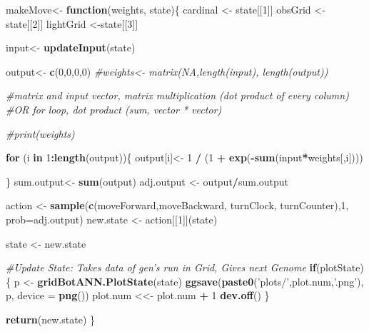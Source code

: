 \documentclass[]{article}
\newenvironment{Shaded}{\begin{snugshade}}{\end{snugshade}}
\newcommand{\CommentTok}[1]{\textcolor[rgb]{0.56,0.35,0.01}{\textit{#1}}}
\newcommand{\ControlFlowTok}[1]{\textcolor[rgb]{0.13,0.29,0.53}{\textbf{#1}}}
\newcommand{\DataTypeTok}[1]{\textcolor[rgb]{0.13,0.29,0.53}{#1}}
\newcommand{\DecValTok}[1]{\textcolor[rgb]{0.00,0.00,0.81}{#1}}
\newcommand{\KeywordTok}[1]{\textcolor[rgb]{0.13,0.29,0.53}{\textbf{#1}}}
\newcommand{\NormalTok}[1]{#1}
\newcommand{\OperatorTok}[1]{\textcolor[rgb]{0.81,0.36,0.00}{\textbf{#1}}}
\newcommand{\StringTok}[1]{\textcolor[rgb]{0.31,0.60,0.02}{#1}}
\begin{document}
\begin{Shaded}
\begin{Highlighting}[]
\NormalTok{makeMove<-}\StringTok{ }\ControlFlowTok{function}\NormalTok{(weights, state)\{}
\NormalTok{  cardinal <-}\StringTok{ }\NormalTok{state[[}\DecValTok{1}\NormalTok{]]}
\NormalTok{  obsGrid <-}\StringTok{ }\NormalTok{state[[}\DecValTok{2}\NormalTok{]]}
\NormalTok{  lightGrid <-state[[}\DecValTok{3}\NormalTok{]]}
  
\NormalTok{  input<-}\StringTok{ }\KeywordTok{updateInput}\NormalTok{(state)}
  
\NormalTok{  output<-}\StringTok{ }\KeywordTok{c}\NormalTok{(}\DecValTok{0}\NormalTok{,}\DecValTok{0}\NormalTok{,}\DecValTok{0}\NormalTok{,}\DecValTok{0}\NormalTok{)}
  \CommentTok{#weights<- matrix(NA,length(input), length(output))}
  
  \CommentTok{#matrix and input vector, matrix multiplication (dot product of every column)}
  \CommentTok{#OR for loop, dot product (sum, vector * vector)}
  
  \CommentTok{#print(weights)}
  
  \ControlFlowTok{for}\NormalTok{ (i }\ControlFlowTok{in} \DecValTok{1}\OperatorTok{:}\KeywordTok{length}\NormalTok{(output))\{}
\NormalTok{      output[i]<-}\StringTok{ }\DecValTok{1} \OperatorTok{/}\StringTok{ }\NormalTok{(}\DecValTok{1} \OperatorTok{+}\StringTok{ }\KeywordTok{exp}\NormalTok{(}\OperatorTok{-}\KeywordTok{sum}\NormalTok{(input}\OperatorTok{*}\NormalTok{weights[,i])))}
    
\NormalTok{  \}}
\NormalTok{  sum.output<-}\StringTok{ }\KeywordTok{sum}\NormalTok{(output)}
\NormalTok{  adj.output <-}\StringTok{ }\NormalTok{output}\OperatorTok{/}\NormalTok{sum.output}
  
  
\NormalTok{  action <-}\StringTok{ }\KeywordTok{sample}\NormalTok{(}\KeywordTok{c}\NormalTok{(moveForward,moveBackward, turnClock, turnCounter),}\DecValTok{1}\NormalTok{,  }\DataTypeTok{prob=}\NormalTok{adj.output)}
\NormalTok{  new.state <-}\StringTok{ }\NormalTok{action[[}\DecValTok{1}\NormalTok{]](state)}
  
\NormalTok{  state <-}\StringTok{ }\NormalTok{new.state}
  
  
  
\CommentTok{#Update State: Takes data of gen's run in Grid, Gives next Genome}
  \ControlFlowTok{if}\NormalTok{(plotState)\{}
\NormalTok{    p <-}\StringTok{ }\KeywordTok{gridBotANN.PlotState}\NormalTok{(state)}
    \KeywordTok{ggsave}\NormalTok{(}\KeywordTok{paste0}\NormalTok{(}\StringTok{'plots/'}\NormalTok{,plot.num,}\StringTok{'.png'}\NormalTok{), p, }\DataTypeTok{device =} \KeywordTok{png}\NormalTok{())}
\NormalTok{    plot.num <<-}\StringTok{ }\NormalTok{plot.num }\OperatorTok{+}\StringTok{ }\DecValTok{1}
    \KeywordTok{dev.off}\NormalTok{()}
\NormalTok{  \}}
  
  \KeywordTok{return}\NormalTok{(new.state)}
\NormalTok{\}}
\end{Highlighting}
\end{Shaded}
\end{document}
